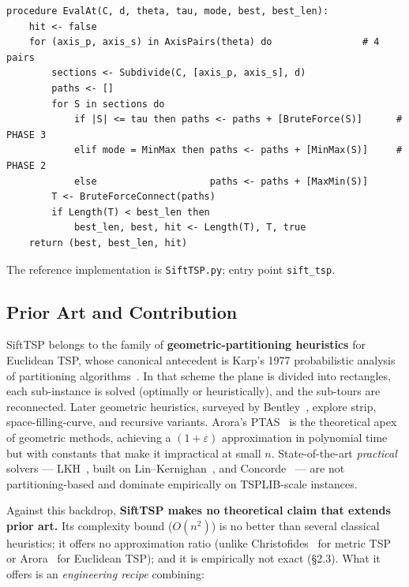 \documentclass[11pt,a4paper]{article}
\begin{document}
\begin{small}
\begin{verbatim}
procedure EvalAt(C, d, theta, tau, mode, best, best_len):
    hit <- false
    for (axis_p, axis_s) in AxisPairs(theta) do                # 4 pairs
        sections <- Subdivide(C, [axis_p, axis_s], d)
        paths <- []
        for S in sections do
            if |S| <= tau then paths <- paths + [BruteForce(S)]      # PHASE 3
            elif mode = MinMax then paths <- paths + [MinMax(S)]     # PHASE 2
            else                    paths <- paths + [MaxMin(S)]
        T <- BruteForceConnect(paths)
        if Length(T) < best_len then
            best_len, best, hit <- Length(T), T, true
    return (best, best_len, hit)
\end{verbatim}
\end{small}

The reference implementation is \texttt{SiftTSP.py}; entry point
\texttt{sift\_tsp}.

\subsection{Prior Art and Contribution}

SiftTSP belongs to the family of \textbf{geometric-partitioning
heuristics} for Euclidean TSP, whose canonical antecedent is Karp's
1977 probabilistic analysis of partitioning algorithms~\cite{karp1977}. In that
scheme the plane is divided into rectangles, each sub-instance is
solved (optimally or heuristically), and the sub-tours are reconnected.
Later geometric heuristics, surveyed by Bentley~\cite{bentley1992}, explore strip,
space-filling-curve, and recursive variants. Arora's PTAS~\cite{arora1998} is the
theoretical apex of geometric methods, achieving a $(1+\varepsilon)$
approximation in polynomial time but with constants that make it
impractical at small $n$. State-of-the-art \emph{practical} solvers ---
LKH~\cite{helsgaun2000}, built on Lin--Kernighan~\cite{linkernighan1973}, and Concorde~\cite{applegate2006} --- are not
partitioning-based and dominate empirically on TSPLIB-scale instances.

Against this backdrop, \textbf{SiftTSP makes no theoretical claim that
extends prior art.} Its complexity bound ($O(n^2)$) is no better than
several classical heuristics; it offers no approximation ratio (unlike
Christofides~\cite{christofides1976} for metric TSP or Arora~\cite{arora1998} for Euclidean TSP); and
it is empirically not exact (\S2.3). What it offers is an
\emph{engineering recipe} combining:
\end{document}
